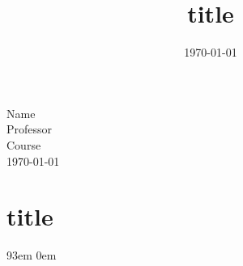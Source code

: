 \documentclass[12pt]{article}
\title{\vspace{-1in}title}
\author{}
\date{\today}
\def\bibindent{3em}
\begin{document}
\noindent Name\\
          Professor\\
          Course\\
          \today
          \section*{title}

\newpage
\begin{thebibliography}{9\kern\bibindent}
\itemsep0em

\end{thebibliography}
\end{document}
